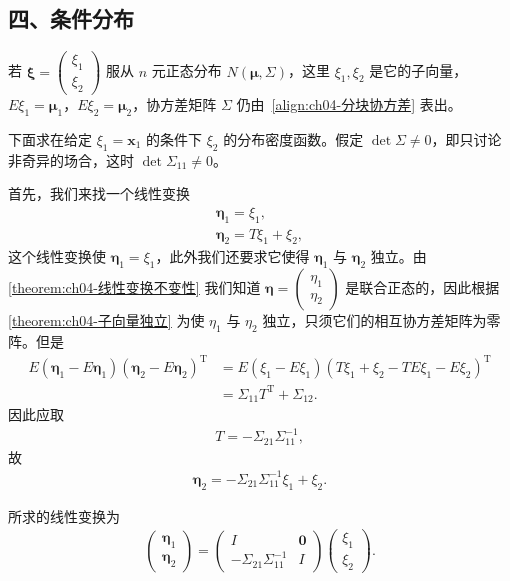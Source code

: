 \documentclass[../../main.tex]{subfiles}
\begin{document}
\subsection*{四、条件分布}

若 $\boldsymbol{\xi}=\begin{pmatrix}\xi_1\\\xi_2\end{pmatrix}$ 服从 $n$ 元正态分布 $N(\boldsymbol{\mu},\Sigma)$，这里 $\xi_1,\xi_2$ 是它的子向量，$E\xi_1=\boldsymbol{\mu}_1$，$E\xi_2=\boldsymbol{\mu}_2$，协方差矩阵 $\Sigma$ 仍由~\eqref{align:ch04-分块协方差} 表出。

下面求在给定 $\xi_1=\boldsymbol{x}_1$ 的条件下 $\xi_2$ 的分布密度函数。假定 $\det\Sigma\neq 0$，即只讨论非奇异的场合，这时 $\det\Sigma_{11}\neq 0$。

首先，我们来找一个线性变换
\begin{align}
\boldsymbol{\eta}_1=\xi_1,\label{align:ch04-条件变换1}\\
\boldsymbol{\eta}_2=T\xi_1+\xi_2,\label{align:ch04-条件变换2}
\end{align}
这个线性变换使 $\boldsymbol{\eta}_1=\xi_1$，此外我们还要求它使得 $\boldsymbol{\eta}_1$ 与 $\boldsymbol{\eta}_2$ 独立。由\cref{theorem:ch04-线性变换不变性} 我们知道 $\boldsymbol{\eta}=\begin{pmatrix}\eta_1\\\eta_2\end{pmatrix}$ 是联合正态的，因此根据\cref{theorem:ch04-子向量独立} 为使 $\eta_1$ 与 $\eta_2$ 独立，只须它们的相互协方差矩阵为零阵。但是
\begin{align*}
E(\boldsymbol{\eta}_1-E\boldsymbol{\eta}_1)(\boldsymbol{\eta}_2-E\boldsymbol{\eta}_2)^{\mathrm{T}}
&=E(\xi_1-E\xi_1)(T\xi_1+\xi_2-TE\xi_1-E\xi_2)^{\mathrm{T}}\\
&=\Sigma_{11}T^{\mathrm{T}}+\Sigma_{12}.
\end{align*}
因此应取
\begin{align}
T=-\Sigma_{21}\Sigma_{11}^{-1},\label{align:ch04-条件变换T}
\end{align}
故
\begin{align}
\boldsymbol{\eta}_2=-\Sigma_{21}\Sigma_{11}^{-1}\xi_1+\xi_2.\label{align:ch04-条件变换eta2}
\end{align}

所求的线性变换为
\begin{align}
\begin{pmatrix}\boldsymbol{\eta}_1\\\boldsymbol{\eta}_2\end{pmatrix}
=\begin{pmatrix}I&\boldsymbol{0}\\-\Sigma_{21}\Sigma_{11}^{-1}&I\end{pmatrix}\begin{pmatrix}\xi_1\\\xi_2\end{pmatrix}.\label{align:ch04-条件变换矩阵}
\end{align}
\end{document}

